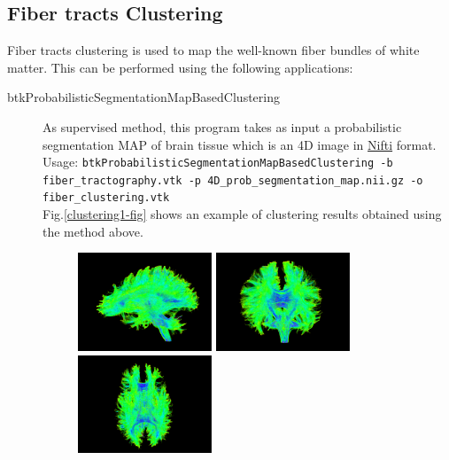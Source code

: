 \subsection{Fiber tracts Clustering}
\label{subsec:clustering}

Fiber tracts clustering is used to map the well-known fiber bundles of white matter.
This can be performed using the following applications:

\begin{description}
        \item[btkProbabilisticSegmentationMapBasedClustering] As supervised method, this program takes as input a probabilistic segmentation MAP of brain tissue which is an 4D image in \href{http://nifti.nimh.nih.gov/nifti-1}{Nifti} format.\\

	Usage: \texttt{btkProbabilisticSegmentationMapBasedClustering -b fiber\_tractography.vtk -p 4D\_prob\_segmentation\_map.nii.gz -o fiber\_clustering.vtk}\\
 
	Fig.\ref{clustering1-fig} shows an example of clustering results obtained using the method above.

	\begin{figure}[h]
	\centering
        \includegraphics[width=4cm]{Tarctography1-Left-View}
        \includegraphics[width=4cm]{Tarctography1-Anterior-View}
        \includegraphics[width=4cm]{Tarctography1-Interior-View}


\end{figure}
\end{description}

